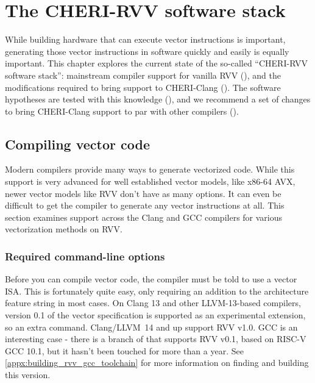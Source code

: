 \chapter{The CHERI-RVV software stack}
While building hardware that can execute vector instructions is important, generating those vector instructions in software quickly and easily is equally important.
This chapter explores the current state of the so-called ``CHERI-RVV software stack'': mainstream compiler support for vanilla RVV (), and the modifications required to bring support to CHERI-Clang ().
The software hypotheses are tested with this knowledge (), and we recommend a set of changes to bring CHERI-Clang support to par with other compilers ().

\section{Compiling vector code}
Modern compilers provide many ways to generate vectorized code.
While this support is very advanced for well established vector models, like x86-64 AVX, newer vector models like RVV don't have as many options.
It can even be difficult to get the compiler to generate any vector instructions at all.
This section examines support across the Clang and GCC compilers for various vectorization methods on RVV.

\subsection{Required command-line options}
Before you can compile vector code, the compiler must be told to use a vector ISA.
This is fortunately quite easy, only requiring an addition to the architecture feature string  in most cases.
On Clang 13 and other LLVM-13-based compilers, version 0.1 of the vector specification is supported as an experimental extension, so an extra command.
Clang/LLVM~14 and up support RVV v1.0.
GCC is an interesting case - there is a branch of  that supports RVV v0.1, based on RISC-V GCC 10.1, but it hasn't been touched for more than a year.
See \cref{appx:building_rvv_gcc_toolchain} for more information on finding and building this version.

